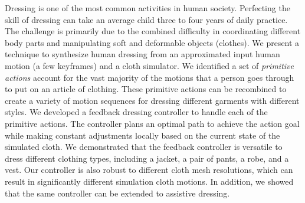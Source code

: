 Dressing is one of the most common activities in human society. Perfecting the skill of dressing can take an average child three to four years of daily practice. The challenge is primarily due to the combined difficulty in coordinating different body parts and manipulating soft and deformable objects (clothes). We present a technique to synthesize human dressing from an approximated input human motion (\eg a few keyframes) and a cloth simulator. We identified a set of \emph{primitive actions} account for the vast majority of the motions that a person goes through to put on an article of clothing. These primitive actions can be recombined to create a variety of motion sequences for dressing different garments with different styles. We developed a feedback dressing controller to handle each of the primitive actions. The controller plans an optimal path to achieve the action goal while making constant adjustments locally based on the current state of the simulated cloth. We demonstrated that the feedback controller is versatile to dress different clothing types, including a jacket, a pair of pants, a robe, and a vest. Our controller is also robust to different cloth mesh resolutions, which can result in significantly different simulation cloth motions. In addition, we showed that the same controller can be extended to assistive dressing.

